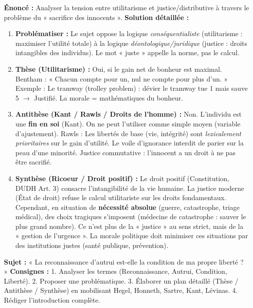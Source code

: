 \documentclass[11pt]{article}
\begin{document}
\begin{exoresolu}
\textbf{Énoncé :} Analyser la tension entre utilitarisme et justice/distributive à travers le problème du « sacrifice des innocents ».
\smallskip
\textbf{Solution détaillée :}
\begin{enumerate}
    \item \textbf{Problématiser :} Le sujet oppose la logique \emph{conséquentialiste} (utilitarisme : maximiser l'utilité totale) à la logique \emph{déontologique/juridique} (justice : droits intangibles des individus). Le mot « juste » appelle la norme, pas le calcul.
    \item \textbf{Thèse (Utilitarisme) :} Oui, si le gain net de bonheur est maximal. Bentham : « Chacun compte pour un, nul ne compte pour plus d'un. » Exemple : Le tramway (trolley problem) : dévier le tramway tue 1 mais sauve 5 $\rightarrow$ Justifié. La morale = mathématiques du bonheur.
    \item \textbf{Antithèse (Kant / Rawls / Droits de l'homme) :} Non. L'individu est une \textbf{fin en soi} (Kant). On ne peut l'utiliser comme simple moyen (variable d'ajustement). Rawls : Les libertés de base (vie, intégrité) sont \emph{lexicalement prioritaires} sur le gain d'utilité. Le voile d'ignorance interdit de parier sur la peau d'une minorité. Justice commutative : l'innocent a un droit à ne pas être sacrifié.
    \item \textbf{Synthèse (Ricoeur / Droit positif) :} Le droit positif (Constitution, DUDH Art. 3) consacre l'intangibilité de la vie humaine. La justice moderne (État de droit) refuse le calcul utilitariste sur les droits fondamentaux. Cependant, en situation de \textbf{nécessité absolue} (guerre, catastrophe, triage médical), des choix tragiques s'imposent (médecine de catastrophe : sauver le plus grand nombre). Ce n'est plus de la « justice » au sens strict, mais de la « gestion de l'urgence ». La morale politique doit minimiser ces situations par des institutions justes (santé publique, prévention).
\end{enumerate}
\end{exoresolu}

\begin{exercice}
\textbf{Sujet :} « La reconnaissance d'autrui est-elle la condition de ma propre liberté ? »
\textbf{Consignes :} 1. Analyser les termes (Reconnaissance, Autrui, Condition, Liberté). 2. Proposer une problématique. 3. Élaborer un plan détaillé (Thèse / Antithèse / Synthèse) en mobilisant Hegel, Honneth, Sartre, Kant, Lévinas. 4. Rédiger l'introduction complète.
\end{exercice}
\end{document}
